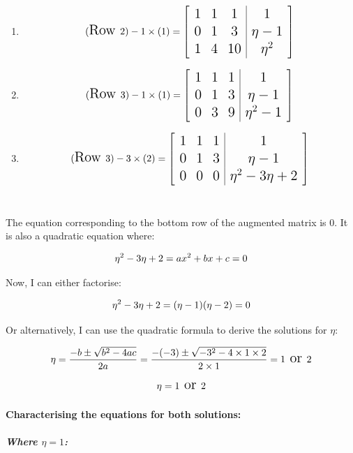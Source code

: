 \documentclass[
]{article}
\begin{document}
\begin{enumerate}
\def\labelenumi{\arabic{enumi}.}
\item
  \[\Large
  (\text{Row }2) -1 \times (1) = 
  \left[
  \begin{array}{ccc|c}
  1 & 1 & 1 & 1 \\
  0 & 1 & 3 & \eta-1 \\
  1 & 4 & 10 & \eta^2
  \end{array}
  \right]
  \]
\item
  \[\Large
   (\text{Row } 3) -1 \times (1) = 
  \left[
  \begin{array}{ccc|c}
  1 & 1 & 1 & 1 \\
  0 & 1 & 3 & \eta-1 \\
  0 & 3 & 9 & \eta^2-1
  \end{array}
  \right]
  \]
\item
  \[\Large
  (\text{Row }3) -3 \times (2) = 
  \left[
  \begin{array}{ccc|c}
  1 & 1 & 1 & 1 \\
  0 & 1 & 3 & \eta-1 \\
  0 & 0 & 0 & \eta^2-3\eta +2
  \end{array}
  \right]
  \]\\
\end{enumerate}

The equation corresponding to the bottom row of the augmented matrix is
0. It is also a quadratic equation where:

\[
\Large
\eta^2-3\eta +2
= ax^2 + bx + c = 0
\]

Now, I can either factorise:

\[
\Large
\eta^2-3\eta +2=
(\eta-1)(\eta-2)= 0
\]

Or alternatively, I can use the quadratic formula to derive the
solutions for \(\eta\):

\[
\Large
\eta = \frac{-b \pm \sqrt{b^2 - 4ac}}{2a}
 = \frac{-(-3) \pm \sqrt{-3^2 - 4\times1\times2}}{2\times1}
 = 1 \text{ or } 2
\]

\hfill\break

\[
\Large
\eta = 1 \text{ or } 2
\]

\hfill\break

\paragraph{Characterising the equations for both
solutions:}\label{characterising-the-equations-for-both-solutions}

\subparagraph{\texorpdfstring{Where
\(\eta = 1\):}{Where \textbackslash eta = 1:}}\label{where-eta-1}
\end{document}
